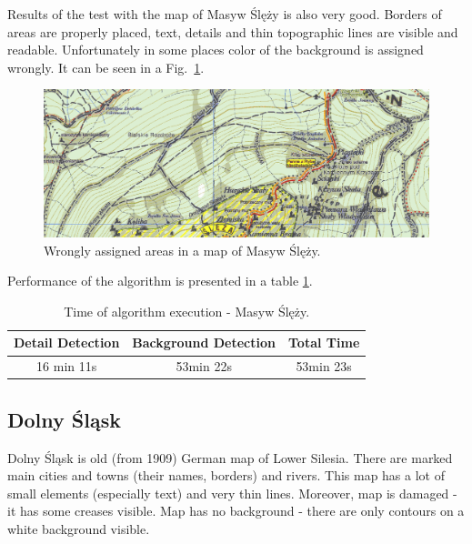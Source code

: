 \documentclass[a4paper,onecolumn,oneside,12pt]{memoir}
\begin{document}
Results of the test with the map of Masyw Ślęży is also very good. Borders of areas are properly
placed, text, details and thin topographic lines are visible and readable. Unfortunately in some
places color of the background is assigned wrongly. It can be seen in a Fig.~\ref{masywSlezyBadAreas}.

\begin{figure}[!ht]
\begin{center}
\includegraphics[scale=0.3]{images/masywSlezyBadAreas.png}
\caption{Wrongly assigned areas in a map of Masyw Ślęży.}
\label{masywSlezyBadAreas}
\end{center}
\end{figure}

Performance of the algorithm is presented in a table \ref{masywSlezyPerformance}.

\begin{table}[!ht]
\begin{center}
\caption{Time of algorithm execution - Masyw Ślęży.}
\label{masywSlezyPerformance}
\begin{tabular}{|c|c|c|}
  \hline
  Detail Detection & Background Detection & Total Time \\
  \hline
  16 min 11s & 53min 22s & 53min 23s \\
  \hline
\end{tabular}
\end{center}
\end{table}

\subsection{Dolny Śląsk}

Dolny Śląsk is old (from 1909) German map of Lower Silesia. There are marked main cities and towns
 (their names, borders) and rivers. This map has a lot of small elements (especially text) and
very thin lines. Moreover, map is damaged - it has some creases visible. Map has no background - 
there are only contours on a white background visible. 
\end{document}
